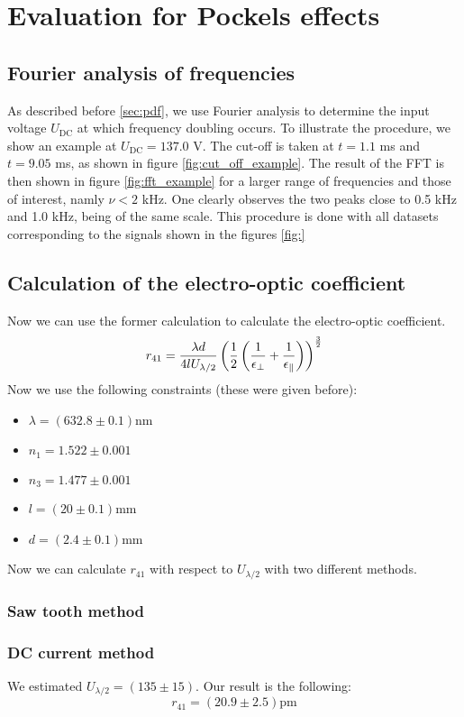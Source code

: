 \section{Evaluation for Pockels effects}
\subsection{Fourier analysis of frequencies}
As described before \ref{sec:pdf}, we use Fourier analysis to determine 
the input voltage $U_\mathrm{DC}$ at which frequency doubling occurs. 
To illustrate the procedure, we show an example at $U_\mathrm{DC} = 137.0$ V.
The cut-off is taken at $t = 1.1$ ms and $t = 9.05$ ms, as shown in figure 
\ref{fig:cut_off_example}. The result of the FFT is then shown in figure 
\ref{fig:fft_example} for a larger range of frequencies and those of interest, 
namly $\nu < 2$ kHz. One clearly observes the two peaks close to 
0.5 kHz and 1.0 kHz, being of the same scale. This procedure is 
done with all datasets corresponding to the signals shown in 
the figures \ref{fig:}



\subsection{Calculation of the electro-optic coefficient}
Now we can use the former calculation to calculate the electro-optic coefficient.
\begin{equation}
    r_{41} = \frac{\lambda d}{4 l U_{\lambda / 2}} 
    \left(\frac{1}{2} \left(\frac{1}{\epsilon_\perp} + \frac{1}{\epsilon_\parallel}\right)\right)^{\frac{3}{2}}
    \label{eq:r_41_U}
\end{equation}
Now we use the following constraints (these were given before):
\begin{itemize}
\setlength\itemsep{0em}
\item[] $\lambda = (632.8\pm 0.1)$nm
\item[] $n_1     = 1.522\pm 0.001$
\item[] $n_3     = 1.477\pm 0.001$
\item[] $l       = ( 20\pm 0.1)$mm
\item[] $d       = (2.4\pm 0.1)$mm
\end{itemize}
Now we can calculate $r_{41}$ with respect to $U_{\lambda/2}$ with two different methods.
\subsubsection{Saw tooth method}
\label{ssub:Saw tooth method}

\subsubsection{DC current method}
\label{ssub:DC current method}
We estimated $U_{\lambda/2}    = (135  \pm 15)$.
Our result is the following: 
\begin{equation*}
r_{41} = \left (20.9 \pm 2.5 \right )  \mathrm{pm}
\end{equation*}
